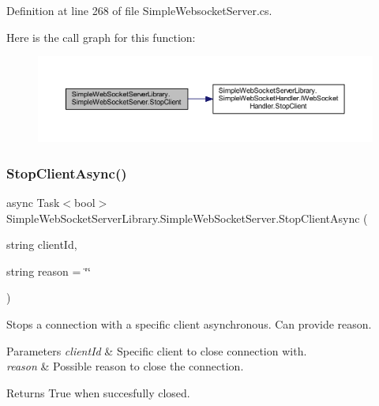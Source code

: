 Definition at line 268 of file Simple\+Websocket\+Server.\+cs.

Here is the call graph for this function\+:
\nopagebreak
\begin{figure}[H]
\begin{center}
\leavevmode
\includegraphics[width=350pt]{class_simple_web_socket_server_library_1_1_simple_web_socket_server_a15254218104e0b1a6af5363c7b0810a6_cgraph}
\end{center}
\end{figure}
\mbox{\label{class_simple_web_socket_server_library_1_1_simple_web_socket_server_ad0559ffe3b936e25e202b205fa2931a7}} 
\subsubsection{\texorpdfstring{Stop\+Client\+Async()}{StopClientAsync()}}
{\footnotesize\ttfamily async Task$<$bool$>$ Simple\+Web\+Socket\+Server\+Library.\+Simple\+Web\+Socket\+Server.\+Stop\+Client\+Async (\begin{DoxyParamCaption}\item[{string}]{client\+Id,  }\item[{string}]{reason = {\ttfamily \char`\"{}\char`\"{}} }\end{DoxyParamCaption})}



Stops a connection with a specific client asynchronous. Can provide reason. 


\begin{DoxyParams}{Parameters}
{\em client\+Id} & Specific client to close connection with.\\
\hline
{\em reason} & Possible reason to close the connection.\\
\hline
\end{DoxyParams}
\begin{DoxyReturn}{Returns}
True when succesfully closed.
\end{DoxyReturn}


